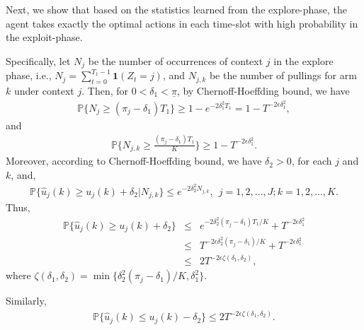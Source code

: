 Next, we show that based on the statistics learned from the explore-phase, the agent takes exactly the optimal actions in each time-slot with high probability in the exploit-phase.

Specifically, let $N_j$ be the number of occurrences of context $j$ in the explore phase, i.e., $N_j = \sum_{t = 0}^{T_1 -1} {\textbf{1}}(Z_t = j)$, and $N_{j,k}$ be the number of pullings for arm $k$ under context $j$. Then, for $0 < \delta_1 < \underline{\pi}$, by Chernoff-Hoeffding bound, we have
\begin{eqnarray}
\mathbb{P}\{N_j \geq (\pi_j - \delta_1) T_1\} \geq 1 - e^{-2 \delta_1^2 T_1} = 1 - T^{-2\epsilon \delta_1^2},
\end{eqnarray}
and
\begin{eqnarray}
\mathbb{P}\{N_{j,k} \geq \frac{(\pi_j - \delta_1) T_1}{K}\} \geq 1 - T^{-2\epsilon \delta_1^2}.
\end{eqnarray}
Moreover, according to Chernoff-Hoeffding bound, we have $\delta_2 > 0$, for each $j$ and $k$, and,
\begin{eqnarray}
\mathbb{P}\{\hat{u}_j(k) \geq u_j(k) + \delta_2\big|N_{j,k}\} \leq e^{-2\delta_2^2 N_{j,k}}, ~~j = 1, 2, \ldots, J; k = 1,2,\ldots, K.
\end{eqnarray}
Thus,
\begin{eqnarray}\label{eq:each_upper}
\mathbb{P}\{\hat{u}_j(k) \geq u_j(k) + \delta_2\big\} &\leq&  e^{-2\delta_2^2 (\pi_j - \delta_1) T_1/K} + T^{-2\epsilon \delta_1^2} \nonumber \\
&\leq& T^{-2\epsilon \delta_2^2 (\pi_j - \delta_1) /K} + T^{-2\epsilon \delta_1^2} \nonumber \\
&\leq& 2 T^{-2 \epsilon\zeta(\delta_1, \delta_2)},
\end{eqnarray}
where $\zeta(\delta_1, \delta_2) = \min\{\delta_2^2 (\pi_j - \delta_1) /K, \delta_1^2\}$.

Similarly,
\begin{eqnarray}\label{eq:each_lower}
\mathbb{P}\{\hat{u}_j(k) \leq u_j(k) - \delta_2\} \leq 2 T^{-2 \epsilon\zeta(\delta_1, \delta_2)}.
\end{eqnarray}


